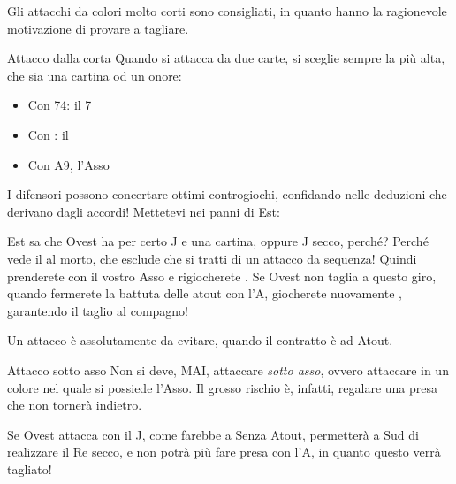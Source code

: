 \documentclass[../corsofiori.tex]{subfiles}
\begin{document}
Gli attacchi da colori molto corti sono consigliati, in quanto hanno la ragionevole motivazione di provare a tagliare.

\begin{regola}{Attacco dalla corta}
    Quando si attacca da due carte, si sceglie sempre la più alta, che sia una cartina od un onore:
    \begin{itemize}
        \item Con 74: il 7
        \item Con : il \Ten
        \item Con A9, l'Asso
    \end{itemize}
\end{regola}

I difensori possono concertare ottimi controgiochi, confidando nelle deduzioni che derivano dagli accordi! Mettetevi nei
panni di Est:

\newgame
{}
\leftupper{\boardtext*}%
{\dealertext\quad}{\vulnertext}

\showAll*

Est sa che Ovest ha per certo J e una cartina, oppure J secco, perché? Perché vede il \Ten\Di al morto, che esclude che
si tratti di un attacco da sequenza! Quindi prenderete con il vostro Asso e rigiocherete \qu. Se Ovest non taglia a questo
giro, quando fermerete la battuta delle atout con l'A\He, giocherete nuovamente \qu, garantendo il taglio al compagno!

Un attacco è assolutamente da evitare, quando il contratto è ad Atout.

\begin{regola}{Attacco sotto asso}
    Non si deve, MAI, attaccare \emph{sotto asso}, ovvero attaccare in un colore nel quale si possiede l'Asso.
    Il grosso rischio è, infatti, regalare una presa che non tornerà indietro.


    Se Ovest attacca con il J\Cl, come farebbe a Senza Atout, permetterà a Sud di realizzare il Re secco, e non potrà
    più fare presa con l'A\Cl, in quanto questo verrà tagliato!


\end{regola}
\end{document}
